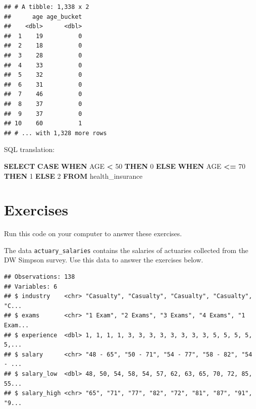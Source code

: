 \documentclass[]{book}
\newenvironment{Shaded}{\begin{snugshade}}{\end{snugshade}}
\newcommand{\ControlFlowTok}[1]{\textcolor[rgb]{0.13,0.29,0.53}{\textbf{#1}}}
\newcommand{\DecValTok}[1]{\textcolor[rgb]{0.00,0.00,0.81}{#1}}
\newcommand{\KeywordTok}[1]{\textcolor[rgb]{0.13,0.29,0.53}{\textbf{#1}}}
\newcommand{\NormalTok}[1]{#1}
\newcommand{\OperatorTok}[1]{\textcolor[rgb]{0.81,0.36,0.00}{\textbf{#1}}}
\newcommand{\StringTok}[1]{\textcolor[rgb]{0.31,0.60,0.02}{#1}}
\begin{document}
\begin{verbatim}
## # A tibble: 1,338 x 2
##      age age_bucket
##    <dbl>      <dbl>
##  1    19          0
##  2    18          0
##  3    28          0
##  4    33          0
##  5    32          0
##  6    31          0
##  7    46          0
##  8    37          0
##  9    37          0
## 10    60          1
## # ... with 1,328 more rows
\end{verbatim}

SQL translation:

\begin{Shaded}
\begin{Highlighting}[]
\KeywordTok{SELECT} \ControlFlowTok{CASE} \ControlFlowTok{WHEN}\NormalTok{ AGE }\OperatorTok{<} \DecValTok{50} \ControlFlowTok{THEN} \DecValTok{0}
       \ControlFlowTok{ELSE} \ControlFlowTok{WHEN}\NormalTok{ AGE }\OperatorTok{<=} \DecValTok{70} \ControlFlowTok{THEN} \DecValTok{1}
       \ControlFlowTok{ELSE} \DecValTok{2}
\KeywordTok{FROM}\NormalTok{ health_insurance}
\end{Highlighting}
\end{Shaded}

\hypertarget{exercises}{%
\section{Exercises}\label{exercises}}

Run this code on your computer to answer these exercises.

The data \texttt{actuary\_salaries} contains the salaries of actuaries collected from the DW Simpson survey. Use this data to answer the exercises below.

\begin{Shaded}
\end{Shaded}

\begin{verbatim}
## Observations: 138
## Variables: 6
## $ industry    <chr> "Casualty", "Casualty", "Casualty", "Casualty", "C...
## $ exams       <chr> "1 Exam", "2 Exams", "3 Exams", "4 Exams", "1 Exam...
## $ experience  <dbl> 1, 1, 1, 1, 3, 3, 3, 3, 3, 3, 3, 3, 5, 5, 5, 5, 5,...
## $ salary      <chr> "48 - 65", "50 - 71", "54 - 77", "58 - 82", "54 - ...
## $ salary_low  <dbl> 48, 50, 54, 58, 54, 57, 62, 63, 65, 70, 72, 85, 55...
## $ salary_high <chr> "65", "71", "77", "82", "72", "81", "87", "91", "9...
\end{verbatim}
\end{document}

